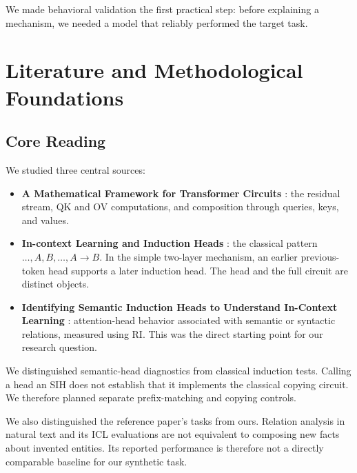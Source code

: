 \documentclass[11pt,a4paper]{article}
\begin{document}
We made behavioral validation the first practical step: before explaining a mechanism, we needed a model that reliably performed the target task.

\section{Literature and Methodological Foundations}
\subsection{Core Reading}
We studied three central sources:
\begin{itemize}
\item \textbf{A Mathematical Framework for Transformer Circuits} \cite{framework}: the residual stream, QK and OV computations, and composition through queries, keys, and values.
\item \textbf{In-context Learning and Induction Heads} \cite{olsson}: the classical pattern $\ldots,A,B,\ldots,A\rightarrow B$. In the simple two-layer mechanism, an earlier previous-token head supports a later induction head. The head and the full circuit are distinct objects.
\item \textbf{Identifying Semantic Induction Heads to Understand In-Context Learning} \cite{ren}: attention-head behavior associated with semantic or syntactic relations, measured using RI. This was the direct starting point for our research question.
\end{itemize}

We distinguished semantic-head diagnostics from classical induction tests. Calling a head an SIH does not establish that it implements the classical copying circuit. We therefore planned separate prefix-matching and copying controls.

We also distinguished the reference paper's tasks from ours. Relation analysis in natural text and its ICL evaluations are not equivalent to composing new facts about invented entities. Its reported performance is therefore not a directly comparable baseline for our synthetic task.
\end{document}
